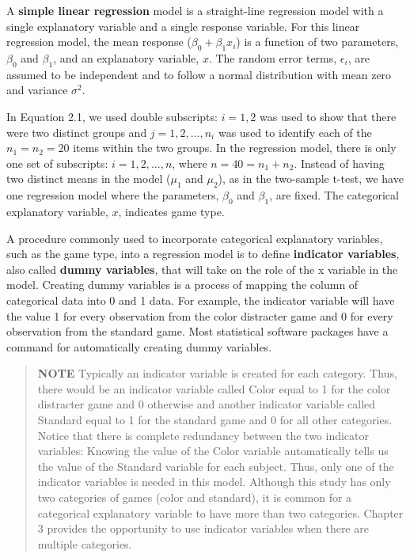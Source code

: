 \documentclass[
]{book}
\begin{document}
A \textbf{simple linear regression} model is a straight-line regression model with a single explanatory variable and a single response variable. For this linear regression model, the mean response (\(\beta_0 + \beta_1x_i\)) is a function of two parameters, \(\beta_0\) and \(\beta_1\), and an explanatory variable, \(x\). The random error terms, \(\epsilon_i\), are assumed to be independent and to follow a normal distribution with mean zero and variance \(\sigma^2\).

In Equation 2.1, we used double subscripts: \(i = 1, 2\) was used to show that there were two distinct groups and \(j = 1, 2, ... , n_i\) was used to identify each of the \(n_1 = n_2 = 20\) items within the two groups. In the regression model, there is only one set of subscripts: \(i = 1, 2, ..., n\), where \(n = 40 = n_1 + n_2\). Instead of having two distinct means in the model (\(\mu_1\) and \(\mu_2\)), as in the two-sample t-test, we have one regression model where the parameters, \(\beta_0\) and \(\beta_1\), are fixed. The categorical explanatory variable, \(x\), indicates game type.

A procedure commonly used to incorporate categorical explanatory variables, such as the game type, into a regression model is to define \textbf{indicator variables}, also called \textbf{dummy variables}, that will take on the role of the x variable in the model. Creating dummy variables is a process of mapping the column of categorical data into 0 and 1 data. For example, the indicator variable will have the value 1 for every observation from the color distracter game and 0 for every observation from the standard game. Most statistical software packages have a command for automatically creating dummy variables.

\begin{quote}
\textbf{NOTE}
Typically an indicator variable is created for each category. Thus, there would be an indicator variable called Color equal to 1 for the color distracter game and 0 otherwise and another indicator variable called Standard equal to 1 for the standard game and 0 for all other categories. Notice that there is complete redundancy between the two indicator variables: Knowing the value of the Color variable automatically tells us the value of the Standard variable for each subject. Thus, only one of the indicator variables is needed in this model. Although this study has only two categories of games (color and standard), it is common for a categorical explanatory variable to have more than two categories. Chapter 3 provides the opportunity to use indicator variables when there are multiple categories.
\end{quote}
\end{document}
